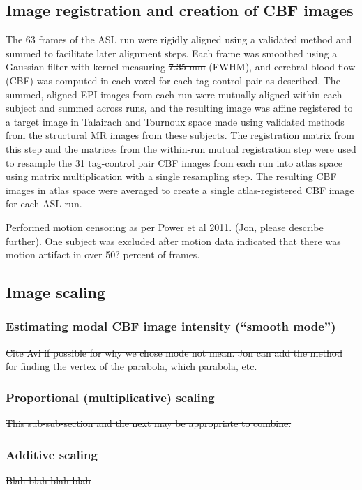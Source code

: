 \subsection{Image registration and creation of CBF images}
The 63 frames of the ASL run were rigidly aligned using a validated method\cite{Black_2001} and summed to facilitate later alignment steps. Each frame was smoothed using a Gaussian filter with kernel measuring \sout{7.35 mm} (FWHM), and cerebral blood flow (CBF) was computed in each voxel for each tag-control pair as described.\cite{Wang_2003} The summed, aligned EPI images from each run were mutually aligned within each subject and summed across runs, and the resulting image was affine registered to a target image in Talairach and Tournoux space made using validated methods from the structural MR images from these subjects.\cite{15130735} The registration matrix from this step and the matrices from the within-run mutual registration step were used to resample the 31 tag-control pair CBF images from each run into atlas space using matrix multiplication with a single resampling step. The resulting CBF images in atlas space were averaged to create a single atlas-registered CBF image for each ASL run. 


Performed motion censoring as per Power et al 2011. (Jon, please describe further). One subject was excluded after motion data indicated that there was motion artifact in over 50? percent of frames.

\subsection{Image scaling}
\subsubsection{Estimating modal CBF image intensity (``smooth mode'')}
\sout{Cite Avi if possible for why we chose mode not mean. Jon can add the method for finding the vertex of the parabola, which parabola, etc.} 
\subsubsection{Proportional (multiplicative) scaling}
\sout{This sub-sub-section and the next may be appropriate to combine.}
\subsubsection{Additive scaling}
\sout{Blah blah blah blah}


